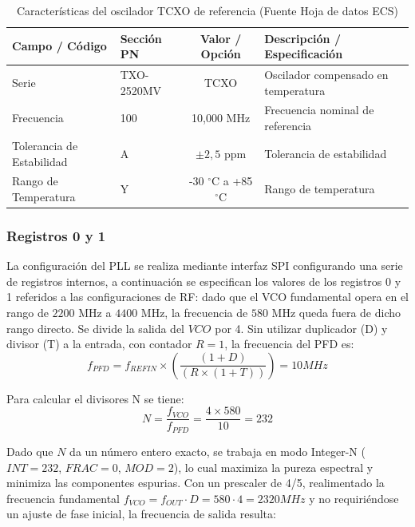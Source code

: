 \documentclass[11pt,a4paper,twoside]{report}
\begin{document}
	\begin{table}[h!]
		\centering
		\begin{tabularx}{\textwidth}{l l c X}
			\toprule
			\textbf{Campo / Código} & \textbf{Sección PN} & \textbf{Valor / Opción} & \textbf{Descripción / Especificación} \\
			\midrule
			Serie & TXO-2520MV & TCXO & Oscilador compensado en temperatura  \\
			Frecuencia & 100 & 10,000 MHz & Frecuencia nominal de referencia \\
			Tolerancia de Estabilidad & A & $\pm 2,5$ ppm & Tolerancia de estabilidad  \\
			Rango de Temperatura & Y & -30 $^\circ$C a +85 $^\circ$C & Rango de temperatura \\
			\bottomrule
		\end{tabularx}
		\caption{Características del oscilador TCXO de referencia (Fuente Hoja de datos ECS)}
		\label{tab:tcxo_caracteristicas}
	\end{table}\newpage
	
	\subsubsection{Registros 0 y 1}
	
	La configuración del PLL se realiza mediante interfaz SPI configurando una serie de registros internos, a continuación se especifican los valores de los registros 0 y 1 referidos a las configuraciones de RF: dado que el VCO fundamental opera en el rango de $2200$ MHz a $4400$ MHz, la frecuencia de $580$ MHz queda fuera de dicho rango directo. Se divide la salida del $VCO$ por 4. Sin utilizar duplicador (D) y divisor (T) a la entrada, con contador $R = 1$, la frecuencia del PFD es:
	\begin{equation}
		f_{PFD} = f_{REFIN} × \left( \frac{(1 + D)}{(R × (1 + T))}\right) = 10MHz
	\end{equation}
	
	Para calcular el divisores N se tiene:
	\begin{equation}
		N = \frac{f_{VCO}}{f_{PFD}} = \frac{4 \times 580}{10} = 232
	\end{equation}
	
	Dado que $N$ da un número entero exacto, se trabaja en modo Integer-N ($INT = 232$, $FRAC = 0$, $MOD = 2$), lo cual maximiza la pureza espectral y minimiza las componentes espurias. Con un prescaler de 4/5, realimentado la frecuencia fundamental $f_{VCO} = f_{OUT} \cdot D = 580 \cdot 4 = 2320MHz$ y no requiriéndose un ajuste de fase inicial, la frecuencia de salida resulta:
	
\end{document}
